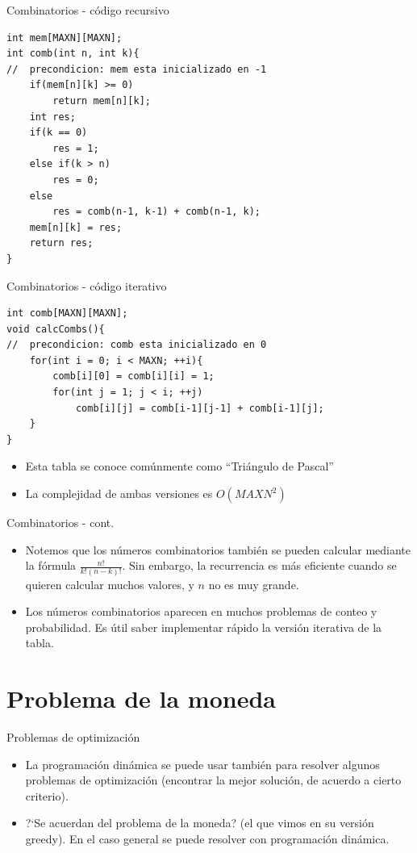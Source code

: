\documentclass{beamer}
\begin{document}
\begin{frame}[fragile]{Combinatorios - c\'odigo recursivo}
\begin{lstlisting}
int mem[MAXN][MAXN];
int comb(int n, int k){
//	precondicion: mem esta inicializado en -1
	if(mem[n][k] >= 0)
		return mem[n][k];
	int res;
	if(k == 0)
		res = 1;
	else if(k > n)
		res = 0;
	else
		res = comb(n-1, k-1) + comb(n-1, k);
	mem[n][k] = res;
	return res;
}
\end{lstlisting}
\end{frame}

\begin{frame}[fragile]{Combinatorios - c\'odigo iterativo}
\begin{lstlisting}
int comb[MAXN][MAXN];
void calcCombs(){
//	precondicion: comb esta inicializado en 0
	for(int i = 0; i < MAXN; ++i){
    	comb[i][0] = comb[i][i] = 1;
        for(int j = 1; j < i; ++j)
        	comb[i][j] = comb[i-1][j-1] + comb[i-1][j];
    }
}
\end{lstlisting}
\begin{itemize}
\item
Esta tabla se conoce com\'unmente como ``Tri\'angulo de Pascal''
\item
La complejidad de ambas versiones es $O(MAXN^2)$
\end{itemize}
\end{frame}
\begin{frame}{Combinatorios - cont.}
\begin{itemize}
\item
Notemos que los n\'umeros combinatorios tambi\'en se pueden calcular mediante la f\'ormula $\frac{n!}{k!(n-k)!}$. Sin embargo, la recurrencia es m\'as eficiente cuando se quieren calcular muchos valores, y $n$ no es muy grande.
\item
Los n\'umeros combinatorios aparecen en muchos problemas de conteo y probabilidad. Es \'util saber implementar r\'apido la versi\'on iterativa de la tabla.
\end{itemize}
\end{frame}

\section{Problema de la moneda}

\begin{frame}{Problemas de optimizaci\'on}
\begin{itemize}
\item
La programaci\'on din\'amica se puede usar tambi\'en para resolver algunos problemas de optimizaci\'on (encontrar la mejor soluci\'on, de acuerdo a cierto criterio).
\item
?`Se acuerdan del problema de la moneda? (el que vimos en su versi\'on greedy). En el caso general se puede resolver con programaci\'on din\'amica.
\end{itemize}
\end{frame}
\end{document}
